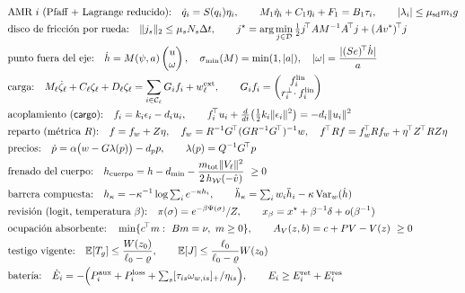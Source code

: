 \begin{align}
  &\text{AMR $i$ (Pfaff + Lagrange reducido):}\quad
  \dot q_i=S(q_i)\eta_i,\qquad M_1\dot\eta_i+C_1\eta_i+F_1=B_1\tau_i,
  \qquad |\lambda_i|\le\mu_{\mathrm{sd}}m_ig \label{eq:N-amr}\\
  &\text{disco de fricción por rueda:}\quad
  \lVert j_s\rVert_2\le\mu_sN_s\Delta t,\qquad
  j^\star=\arg\min_{j\in\Dcal}\tfrac12 j^{\!\top}AM^{-1}A^{\!\top}j+(Av^{*})^{\!\top}j \label{eq:N-disco}\\
  &\text{punto fuera del eje:}\quad
  \dot h=M(\psi,a)\begin{pmatrix}u\\ \omega\end{pmatrix},\quad
  \sigma_{\min}(M)=\min(1,|a|),\quad
  |\omega|=\frac{|(Se)^{\!\top}\dot h|}{a} \label{eq:N-eje}\\
  &\text{carga:}\quad
  M_\ell\dot\zeta_\ell+C_\ell\zeta_\ell+D_\ell\zeta_\ell=\sum_{i\in\Ccal_\ell}G_if_i+w^{\mathrm{ext}}_\ell,
  \qquad G_if_i=\begin{pmatrix}f_i^{\mathrm{lin}}\\ r_i^{\perp}\!\cdot f_i^{\mathrm{lin}}\end{pmatrix} \label{eq:N-carga}\\
  &\text{acoplamiento (\textsf{cargo}):}\quad
  f_i=k_i\epsilon_i-d_iu_i,\qquad
  f_i^{\!\top}u_i+\tfrac{d}{dt}\bigl(\tfrac12k_i\lVert\epsilon_i\rVert^{2}\bigr)=-d_i\lVert u_i\rVert^{2} \label{eq:N-pad}\\
  &\text{reparto (métrica $R$):}\quad
  f=f_w+Z\eta,\quad f_w=R^{-1}G^{\!\top}(GR^{-1}G^{\!\top})^{-1}w,\quad
  f^{\!\top}Rf=f_w^{\!\top}Rf_w+\eta^{\!\top}Z^{\!\top}RZ\eta \label{eq:N-reparto}\\
  &\text{precios:}\quad
  \dot p=\alpha\bigl(w-G\lambda(p)\bigr)-d_pp,\qquad
  \lambda(p)=Q^{-1}G^{\!\top}p \label{eq:N-precio}\\
  &\text{frenado del cuerpo:}\quad
  h_{\mathrm{cuerpo}}=h-d_{\min}-\frac{m_{\mathrm{tot}}\lVert V_\ell\rVert^{2}}{2\,h_{\mathcal W}(-\hat v)}\ \ge0 \label{eq:N-freno}\\
  &\text{barrera compuesta:}\quad
  h_\kappa=-\kappa^{-1}\log\textstyle\sum_ie^{-\kappa h_i},\qquad
  \ddot h_\kappa=\textstyle\sum_iw_i\ddot h_i-\kappa\,\mathrm{Var}_w(\dot h) \label{eq:N-softmin}\\
  &\text{revisión (logit, temperatura $\beta$):}\quad
  \pi(\sigma)=e^{-\beta\Psi(\sigma)}/Z,\qquad
  x_\beta=x^\star+\beta^{-1}\delta+o(\beta^{-1}) \label{eq:N-logit}\\
  &\text{ocupación absorbente:}\quad
  \min\{c^{\!\top}m:\ Bm=\nu,\ m\ge0\},\qquad
  A_V(z,b)=c+PV-V(z)\ \ge0 \label{eq:N-ocup}\\
  &\text{testigo vigente:}\quad
  \mathbb E[T_g]\le\frac{W(z_0)}{\ell_0-\varrho},\qquad
  \mathbb E[J]\le\frac{\ell_0}{\ell_0-\varrho}W(z_0) \label{eq:N-testigo}\\
  &\text{batería:}\quad
  \dot E_i=-\Bigl(P^{\mathrm{aux}}_i+P^{\mathrm{loss}}_i+\textstyle\sum_s[\tau_{is}\omega_{w,is}]_+/\eta_{is}\Bigr),
  \qquad E_i\ge E^{\mathrm{ret}}_i+E^{\mathrm{res}}_i \label{eq:N-bat}
\end{align}

